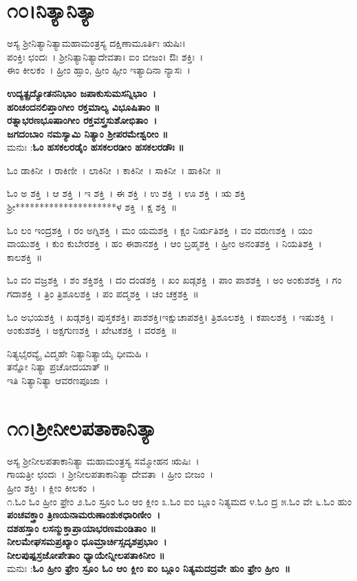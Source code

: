\section{೧೦।ನಿತ್ಯಾನಿತ್ಯಾ}
ಅಸ್ಯ ಶ್ರೀನಿತ್ಯಾನಿತ್ಯಾಮಹಾಮಂತ್ರಸ್ಯ ದಕ್ಷಿಣಾಮೂರ್ತಿಃ ಋಷಿಃ।\\ ಪಂಕ್ತಿಃ ಛಂದಃ~। ಶ್ರೀನಿತ್ಯಾನಿತ್ಯಾದೇವತಾ। ಐಂ ಬೀಜಂ। ಔಃ ಶಕ್ತಿಃ~।\\ ಈಂ ಕೀಲಕಂ~। ಹ್ರೀಂ ಹ್ಸಾಂ, ಹ್ರೀಂ ಹ್ಸೀಂ ಇತ್ಯಾದಿನಾ ನ್ಯಾಸಃ~।

{\bfseries ಉದ್ಯತ್ಪ್ರದ್ಯೋತನನಿಭಾಂ ಜಪಾಕುಸುಮಸನ್ನಿಭಾಂ~।\\
ಹರಿಚಂದನಲಿಪ್ತಾಂಗೀಂ ರಕ್ತಮಾಲ್ಯ ವಿಭೂಷಿತಾಂ ॥\\
ರತ್ನಾಭರಣಭೂಷಾಂಗೀಂ ರಕ್ತವಸ್ತ್ರಸುಶೋಭಿತಾಂ~।\\
ಜಗದಂಬಾಂ ನಮಸ್ಯಾಮಿ ನಿತ್ಯಾಂ ಶ್ರೀಪರಮೇಶ್ವರೀಂ ॥\\}
ಮನುಃ :{\bfseries  ಓಂ ಹಸಕಲರಡೈಂ ಹಸಕಲರಡೀಂ ಹಸಕಲರಡೌಃ ॥}

ಓಂ ಡಾಕಿನೀ~।  ರಾಕಿಣೀ~।  ಲಾಕಿನೀ~।  ಕಾಕಿನೀ~।  ಸಾಕಿನೀ~।  ಹಾಕಿನೀ~॥ 

ಓಂ ಅ ಶಕ್ತಿ~।  ಆ ಶಕ್ತಿ~।  ಇ ಶಕ್ತಿ~।  ಈ ಶಕ್ತಿ~।  ಉ ಶಕ್ತಿ~।  ಊ ಶಕ್ತಿ~।  ಋ ಶಕ್ತಿ ಶ್ರೀ*********************ಳ ಶಕ್ತಿ~।  ಕ್ಷ ಶಕ್ತಿ~॥ 

ಓಂ ಲಂ ಇಂದ್ರಶಕ್ತಿ~।  ರಂ ಅಗ್ನಿಶಕ್ತಿ~।  ಮಂ ಯಮಶಕ್ತಿ~।  ಕ್ಷಂ ನಿರ್ಋತಿಶಕ್ತಿ~।  ವಂ ವರುಣಶಕ್ತಿ~।  ಯಂ ವಾಯುಶಕ್ತಿ~।  ಕುಂ ಕುಬೇರಶಕ್ತಿ~।  ಹಂ ಈಶಾನಶಕ್ತಿ~।  ಆಂ ಬ್ರಹ್ಮಶಕ್ತಿ~।  ಹ್ರೀಂ ಅನಂತಶಕ್ತಿ~।  ನಿಯತಿಶಕ್ತಿ~।  ಕಾಲಶಕ್ತಿ~॥ 

ಓಂ ವಂ ವಜ್ರಶಕ್ತಿ~।  ಶಂ ಶಕ್ತಿಶಕ್ತಿ~।  ದಂ ದಂಡಶಕ್ತಿ~।  ಖಂ ಖಡ್ಗಶಕ್ತಿ~।  ಪಾಂ ಪಾಶಶಕ್ತಿ~।  ಅಂ ಅಂಕುಶಶಕ್ತಿ~।  ಗಂ ಗದಾಶಕ್ತಿ~।  ತ್ರಿಂ ತ್ರಿಶೂಲಶಕ್ತಿ~।  ಪಂ ಪದ್ಮಶಕ್ತಿ~।  ಚಂ ಚಕ್ರಶಕ್ತಿ~॥ 

ಓಂ ಅಭಯಶಕ್ತಿ~।  ಖಡ್ಗಶಕ್ತಿ। ಪುಸ್ತಕಶಕ್ತಿ। ಪಾಶಶಕ್ತಿ।ಇಕ್ಷುಚಾಪಶಕ್ತಿ। ತ್ರಿಶೂಲಶಕ್ತಿ~।  ಕಪಾಲಶಕ್ತಿ~।  ಇಷುಶಕ್ತಿ~।  ಅಂಕುಶಶಕ್ತಿ~।  ಅಕ್ಷಗುಣಶಕ್ತಿ~।  ಖೇಟಕಶಕ್ತಿ~।  ವರಶಕ್ತಿ~॥

ನಿತ್ಯಭೈರವ್ಯೈ ವಿದ್ಮಹೇ ನಿತ್ಯಾನಿತ್ಯಾಯೈ ಧೀಮಹಿ ।\\ತನ್ನೋ ನಿತ್ಯಾ ಪ್ರಚೋದಯಾತ್ ॥\\
ಇತಿ ನಿತ್ಯಾನಿತ್ಯಾ ಆವರಣಪೂಜಾ~।
\section{೧೧।ಶ್ರೀನೀಲಪತಾಕಾನಿತ್ಯಾ}
ಅಸ್ಯ ಶ್ರೀನೀಲಪತಾಕಾನಿತ್ಯಾ ಮಹಾಮಂತ್ರಸ್ಯ ಸಮ್ಮೋಹನ ಋಷಿಃ~। \\ಗಾಯತ್ರೀ ಛಂದಃ~। ಶ್ರೀನೀಲಪತಾಕಾನಿತ್ಯಾ ದೇವತಾ~। ಹ್ರೀಂ ಬೀಜಂ~।\\ ಹ್ರೀಂ ಶಕ್ತಿಃ~। ಕ್ಲೀಂ ಕೀಲಕಂ~।\\
೧.ಓಂ ಓಂ ಹ್ರೀಂ ಫ್ರೇಂ ೨.ಓಂ ಸ್ರೂಂ ಓಂ ಆಂ ಕ್ಲೀಂ ೩.ಓಂ ಐಂ ಬ್ಲೂಂ ನಿತ್ಯಮದ ೪.ಓಂ ದ್ರ ೫.ಓಂ ವೇ ೬.ಓಂ ಹುಂ \\
{\bfseries ಪಂಚವಕ್ತ್ರಾಂ ತ್ರಿಣಯನಾಮರುಣಾಂಶುಕಧಾರಿಣೀಂ~।\\
ದಶಹಸ್ತಾಂ ಲಸನ್ಮುಕ್ತಾಪ್ರಾಯಾಭರಣಮಂಡಿತಾಂ ॥\\
ನೀಲಮೇಘಸಮಪ್ರಖ್ಯಾಂ ಧೂಮ್ರಾರ್ಚಿಸ್ಸದೃಶಪ್ರಭಾಂ~।\\
ನೀಲಪುಷ್ಪಸ್ರಜೋಪೇತಾಂ ಧ್ಯಾಯೇನ್ನೀಲಪತಾಕಿನೀಂ ॥\\}
ಮನುಃ :{\bfseries ಓಂ ಹ್ರೀಂ ಫ್ರೇಂ ಸ್ರೂಂ ಓಂ ಆಂ ಕ್ಲೀಂ ಐಂ ಬ್ಲೂಂ ನಿತ್ಯಮದದ್ರವೇ ಹುಂ ಫ್ರೇಂ ಹ್ರೀಂ~॥}

